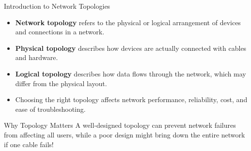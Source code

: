 \documentclass[aspectratio=169]{beamer}
\begin{document}
\begin{frame}{Introduction to Network Topologies}

\begin{itemize}
    \item \textbf{Network topology} refers to the physical or logical arrangement of devices and connections in a network.
    \item \textbf{Physical topology} describes how devices are actually connected with cables and hardware.
    \item \textbf{Logical topology} describes how data flows through the network, which may differ from the physical layout.
    \item Choosing the right topology affects network performance, reliability, cost, and ease of troubleshooting.
\end{itemize}

\vspace{0.3cm}

\begin{alertblock}{Why Topology Matters}
A well-designed topology can prevent network failures from affecting all users, while a poor design might bring down the entire network if one cable fails!
\end{alertblock}

\end{frame}
\end{document}
